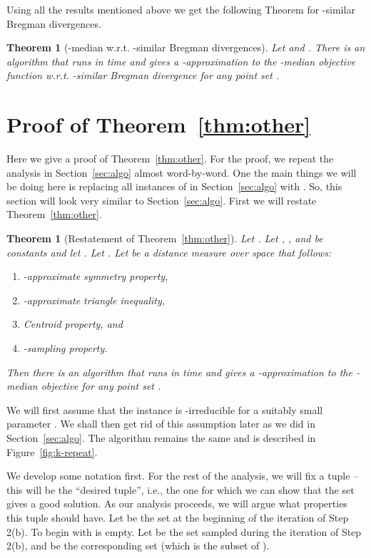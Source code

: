 \documentclass[a4paper]{article}
\newtheorem{theorem}{Theorem}
\newtheorem*{thm}{Theorem}
\begin{document}
Using all the results mentioned above we get the following Theorem for -similar Bregman divergences.

\begin{theorem}[-median w.r.t. -similar Bregman divergences]
Let  and . There is an algorithm that runs in time  and gives a -approximation to the -median objective function w.r.t. -similar Bregman divergence for any point set .
\end{theorem}







\appendix

\section{Proof of Theorem~\ref{thm:other}}\label{appendix:A}
Here we give a proof of Theorem~\ref{thm:other}. For the proof, we repeat the analysis in Section~\ref{sec:algo} almost word-by-word. One the main things we will be doing here is replacing all instances of  in Section~\ref{sec:algo} with . So, this section will look very similar to Section~\ref{sec:algo}. 
First we will restate Theorem~\ref{thm:other}.

\begin{thm}[Restatement of Theorem~\ref{thm:other}]
Let . Let , , and  be constants and let . Let . Let  be a distance measure over space  that  follows:
\begin{enumerate}
\item -approximate symmetry property,

\item -approximate triangle inequality,

\item Centroid property, and

\item -sampling property.
\end{enumerate}
Then there is an algorithm that runs in time  and gives a -approximation to the -median objective for any point set .
\end{thm}

We will first assume that the instance is -irreducible for a suitably small parameter . 
We shall then get rid of this assumption later as we did in Section~\ref{sec:algo}. 
The algorithm remains the same and is described in Figure~\ref{fig:k-repeat}. 

We develop some notation first. For the rest of the analysis, we will fix a tuple  --
this will be the ``desired tuple'', i.e., the one for which we can show that the set  gives a good solution.
As our analysis proceeds, we will argue what properties this tuple should have. Let  be the set 
at the beginning of the  iteration of Step 2(b). To begin with  is empty. Let 
be the set  sampled during the  iteration of Step 2(b), and  be the corresponding set 
(which is the  subset of ).
\end{document}
